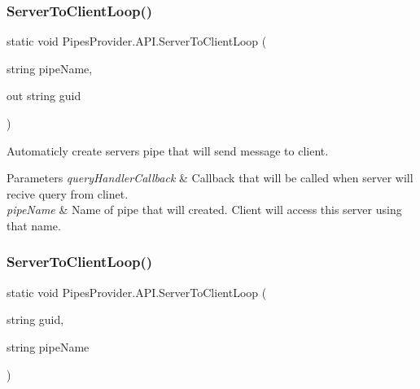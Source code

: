 \subsubsection{\texorpdfstring{Server\+To\+Client\+Loop()}{ServerToClientLoop()}\hspace{0.1cm}{\footnotesize\ttfamily [1/2]}}
{\footnotesize\ttfamily static void Pipes\+Provider.\+A\+P\+I.\+Server\+To\+Client\+Loop (\begin{DoxyParamCaption}\item[{string}]{pipe\+Name,  }\item[{out string}]{guid }\end{DoxyParamCaption})\hspace{0.3cm}{\ttfamily [static]}}



Automaticly create server\textquotesingle{}s pipe that will send message to client. 


\begin{DoxyParams}{Parameters}
{\em query\+Handler\+Callback} & Callback that will be called when server will recive query from clinet.\\
\hline
{\em pipe\+Name} & Name of pipe that will created. Client will access this server using that name.\\
\hline
\end{DoxyParams}
\mbox{\label{class_pipes_provider_1_1_a_p_i_ae24aa9b5d3220b373d5689bddc22e924}} 
\subsubsection{\texorpdfstring{Server\+To\+Client\+Loop()}{ServerToClientLoop()}\hspace{0.1cm}{\footnotesize\ttfamily [2/2]}}
{\footnotesize\ttfamily static void Pipes\+Provider.\+A\+P\+I.\+Server\+To\+Client\+Loop (\begin{DoxyParamCaption}\item[{string}]{guid,  }\item[{string}]{pipe\+Name }\end{DoxyParamCaption})\hspace{0.3cm}{\ttfamily [static]}}



